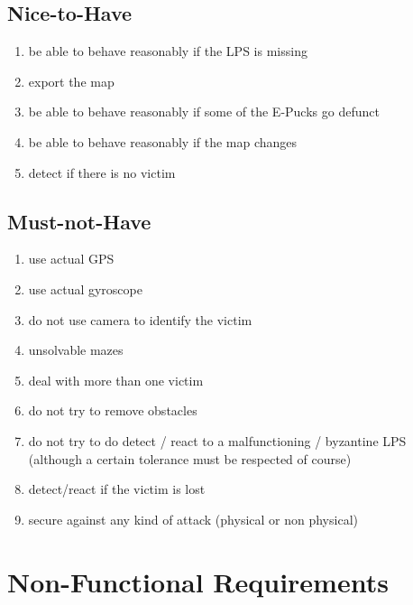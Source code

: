 \documentclass[a4paper,parskip,headheight=38pt]{scrartcl} %
\begin{document}
\subsection{Nice-to-Have}
\begin{enumerate}[label=\nicetohave,ref=\nicetohave]
\item be able to behave reasonably if the LPS is missing \label{req:missLPS}
\item export the map
\item be able to behave reasonably if some of the E-Pucks go defunct \label{req:puckFault}
\item be able to behave reasonably if the map changes \label{req:mapChange}
\item detect if there is no victim
\end{enumerate}

\subsection{Must-not-Have}
\begin{enumerate}[label=\mustnothave]
\item use actual GPS
\item use actual gyroscope
\item do not use camera to identify the victim
\item unsolvable mazes
\item deal with more than one victim
\item do not try to remove obstacles
\item do not try to do detect / react to a malfunctioning / byzantine LPS (although a certain tolerance must be respected of course)
\item detect/react if the victim is lost
\item secure against any kind of attack (physical or non physical)
\end{enumerate}

\section{Non-Functional Requirements}
\end{document}
